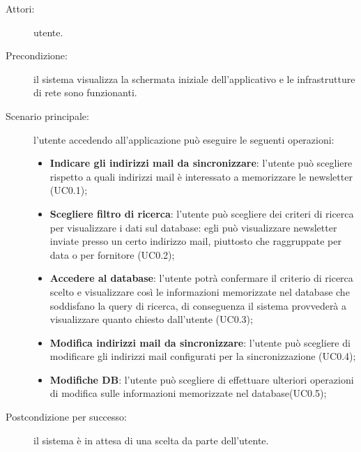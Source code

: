 \begin{description}
\item[Attori:]{utente.}
\item[Precondizione:]{il sistema visualizza la schermata iniziale dell\textquoteright{}applicativo e le infrastrutture di rete sono funzionanti.}
\item[Scenario principale:]{l\textquoteright{}utente accedendo all\textquoteright{}applicazione pu\`{o} eseguire le seguenti operazioni:
	\begin{itemize}
	\item \textbf{Indicare gli indirizzi mail da sincronizzare}: l\textquoteright{}utente pu\`{o} scegliere rispetto a quali indirizzi mail \`{e} interessato a memorizzare le newsletter (UC0.1);
	\item \textbf{Scegliere filtro di ricerca}: l\textquoteright{}utente pu\`{o} scegliere dei criteri di ricerca per visualizzare i dati sul database: egli pu\`{o} visualizzare newsletter inviate presso un certo indirizzo mail, piuttosto che raggruppate per data o per fornitore (UC0.2);
	\item \textbf{Accedere al database}: l\textquoteright{}utente potr\`{a} confermare il criterio di ricerca scelto e visualizzare cos\`{i} le informazioni memorizzate nel database che soddisfano la query di ricerca, di conseguenza il sistema provveder\`{a} a visualizzare quanto chiesto dall\textquoteright{}utente (UC0.3);
	\item \textbf{Modifica indirizzi mail da sincronizzare}: l\textquoteright{}utente pu\`{o} scegliere di modificare gli indirizzi mail configurati per la sincronizzazione (UC0.4);
	\item \textbf{Modifiche DB}: l\textquoteright{}utente pu\`{o} scegliere di effettuare ulteriori operazioni di modifica sulle informazioni memorizzate nel database(UC0.5);	
	\end{itemize}}
\item[Postcondizione per successo:]{il sistema \`{e} in attesa di una scelta da parte dell\textquoteright{}utente.}
\end{description}


